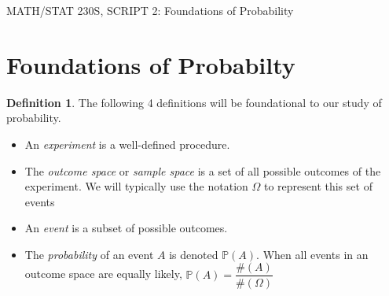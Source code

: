 \documentclass[12pt]{article}
\renewcommand{\_}[1]{\underline{ #1 }}
\theoremstyle{definition}
\newtheorem{definition}[theorem]{Definition}
\numberwithin{equation}{subsection}
\begin{document}
\begin{center}
{\large MATH/STAT 230S, SCRIPT 2: Foundations of Probability} \\ 
\vspace{.2in}  

\end{center}
\setcounter{section}{1}

\section{Foundations of Probabilty}
\begin{definition} The following 4 definitions will be foundational to our study of probability.
	\begin{itemize}
		\item An \emph{experiment} is a well-defined procedure.
		\item The \emph{outcome space} or \emph{sample space} is a set of all possible outcomes of the experiment. We will typically use the notation $\Omega$ to represent this set of events
		\item An \emph{event} is a subset of possible outcomes.
		\item The \emph{probability} of an event $A$ is denoted $\mathbb{P}(A)$. When all events in an outcome space are equally likely, $\mathbb{P}(A)=\dfrac{\#(A)}{\#(\Omega)}$
	\end{itemize}
\end{definition}
\end{document}

